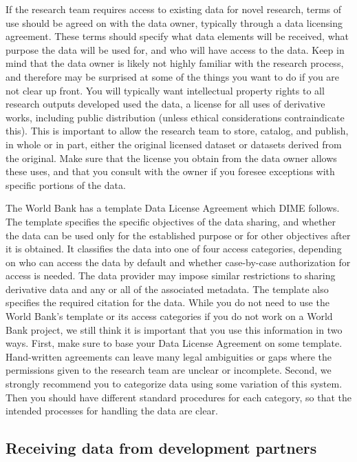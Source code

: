If the research team requires access to existing data for novel research,
terms of use should be agreed on with the data owner,
typically through a data licensing agreement.
These terms should specify what data elements will be received,
what purpose the data will be used for, and who will have access to the data.
Keep in mind that the data owner is likely not highly familiar
with the research process, and therefore may be surprised
at some of the things you want to do if you are not clear up front.
You will typically want intellectual property rights to all research outputs developed used the data,
a license for all uses of derivative works, including public distribution
(unless ethical considerations contraindicate this).
This is important to allow the research team to store, catalog, and publish, in whole or in part,
either the original licensed dataset or datasets derived from the original.
Make sure that the license you obtain from the data owner allows these uses,
and that you consult with the owner
if you foresee exceptions with specific portions of the data.

The World Bank has a template Data License Agreement which DIME follows.
The template specifies the specific objectives of the data sharing,
and whether the data can be used only for the established purpose
or for other objectives after it is obtained.
It classifies the data into one of four access categories,
depending on who can access the data by default
and whether case-by-case authorization for access is needed.
The data provider may impose similar restrictions
to sharing derivative data and any or all of the associated metadata.
The template also specifies the required citation for the data.
While you do not need to use the World Bank's template
or its access categories if you do not work on a World Bank project,
we still think it is important that you use this information in two ways.
First, make sure to base your Data License Agreement on some template.
Hand-written agreements can leave many legal ambiguities or gaps
where the permissions given to the research team are unclear or incomplete.
Second, we strongly recommend you to categorize data using some variation of this system.
Then you should have different standard procedures for each category,
so that the intended processes for handling the data are clear.


\subsection{Receiving data from development partners}

